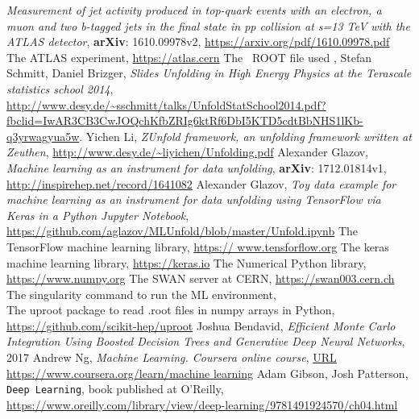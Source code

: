 \begin{thebibliography}{11}

 \textit{Measurement of jet activity produced in top-quark events with an electron, a muon and two b-tagged jets in the final state in pp collision at s=13 TeV with the ATLAS detector}, \textbf{arXiv}: 1610.09978v2, \url{https://arxiv.org/pdf/1610.09978.pdf}
 The ATLAS experiment, \url{https://atlas.cern}
 The \ttbaremu~ROOT file used {\tiny \texttt{}}
, Stefan Schmitt, Daniel Brizger, \textit{Slides Unfolding in High Energy Physics at the Terascale statistics school 2014}, \url{http://www.desy.de/~sschmitt/talks/UnfoldStatSchool2014.pdf?fbclid=IwAR3CB3CwJOQchKfbZRIg6ktRf6DbI5KTD5cdtBbNHS1lKb-q3yrwagyua5w}.
 Yichen Li, \textit{ZUnfold framework, an unfolding framework written at Zeuthen}, \url{http://www.desy.de/~liyichen/Unfolding.pdf}
 Alexander Glazov, \textit{Machine learning as an instrument for data unfolding}, \textbf{arXiv}: 1712.01814v1, \url{http://inspirehep.net/record/1641082}
 Alexander Glazov, \textit{Toy data example for machine learning as an instrument  for data unfolding using TensorFlow via Keras in a Python Jupyter Notebook}, \url{https://github.com/aglazov/MLUnfold/blob/master/Unfold.ipynb}
 The TensorFlow machine learning library, \url{https:// www.tensforflow.org}
 The keras machine learning library, \url{https://keras.io}
 The Numerical Python library, \url{https://www.numpy.org}
 The SWAN server at CERN, \url{https://swan003.cern.ch}
 The singularity command to run the ML environment, \\ {\tiny \texttt {}}
 The uproot package to read .root files in numpy arrays in Python, \url{https://github.com/scikit-hep/uproot}
 Joshua Bendavid, \textit{Efficient Monte Carlo Integration Using Boosted Decision Trees and Generative Deep Neural Networks}, 2017
 Andrew Ng, \textit{Machine Learning. Coursera online course}, \url{URL https://www.coursera.org/learn/machine learning}
 Adam Gibson, Josh Patterson, \texttt{Deep Learning}, book published at O'Reilly, \url{https://www.oreilly.com/library/view/deep-learning/9781491924570/ch04.html}

\end{thebibliography}
